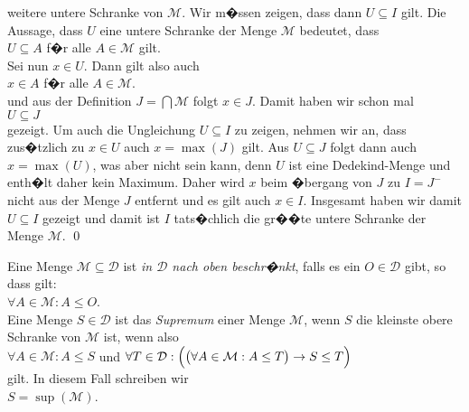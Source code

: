 weitere untere Schranke von $\mathcal{M}$. Wir m�ssen zeigen, dass dann $U \subseteq I$ gilt.  Die
Aussage, dass $U$ eine untere Schranke der Menge $\mathcal{M}$ bedeutet, dass
\\[0.2cm]
\hspace*{1.3cm}
$U \subseteq A$ \quad f�r alle $A \in \mathcal{M}$ gilt.
\\[0.2cm]
Sei nun $x \in U$.  Dann gilt also auch
\\[0.2cm]
\hspace*{1.3cm}
$x \in A$ \quad f�r alle $A \in \mathcal{M}$.
\\[0.2cm]
und aus der Definition $J = \bigcap \mathcal{M}$ folgt $x \in J$.  Damit haben wir schon mal 
\\[0.2cm]
\hspace*{1.3cm}
$U \subseteq J$
\\[0.2cm]
gezeigt.  Um auch die Ungleichung $U \subseteq I$ zu zeigen,  nehmen wir an, dass zus�tzlich zu $x \in U$
auch $x = \max(J)$ gilt.  Aus $U \subseteq J$ folgt dann auch $x = \max(U)$,  was aber nicht sein kann,
denn $U$ ist eine Dedekind-Menge und enth�lt daher kein Maximum.  Daher wird $x$ beim �bergang von $J$ zu
$I = J^-$ nicht aus der Menge $J$ entfernt und es gilt auch $x \in I$.   Insgesamt haben wir damit
$U \subseteq I$
gezeigt und damit ist $I$ tats�chlich die gr��te untere Schranke der Menge $\mathcal{M}$.
\qed



\begin{Definition}[Supremum]
Eine Menge $\mathcal{M} \subseteq \mathcal{D}$ ist \emph{in $\mathcal{D}$ nach oben beschr�nkt}, falls es ein
 $O \in \mathcal{D}$ gibt, so dass gilt:
\\[0.2cm]
\hspace*{1.3cm}
$\forall A \in \mathcal{M}:  A \leq O$.
\\[0.2cm]
Eine Menge $S \in \mathcal{D}$ ist das \emph{Supremum} einer Menge $\mathcal{M}$, wenn $S$ die kleinste
obere Schranke von $\mathcal{M}$ ist, wenn also 
\\[0.2cm]
\hspace*{1.3cm}
$\forall A \in \mathcal{M}: A \leq S$ \quad \mbox{und} \quad
$\forall T \in \mathcal{D}: \Bigl(\bigl(\forall A \in \mathcal{M}: A \leq T \bigr)\rightarrow S \leq T \Bigr)$
\\[0.2cm]
gilt.  In diesem Fall schreiben wir
\\[0.2cm]
\hspace*{1.3cm}
$S = \sup( \mathcal{M} )$.
\eod
\end{Definition}


